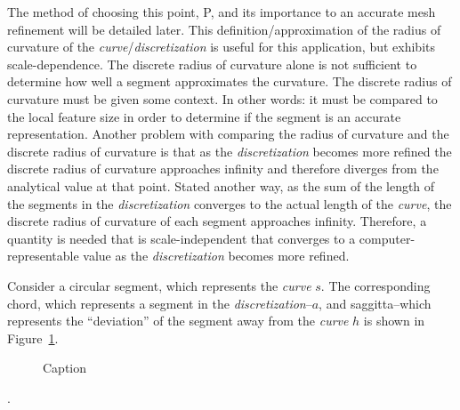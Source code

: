 The method of choosing this point, P, and its importance to an accurate mesh refinement will be detailed later. This definition/approximation of the radius of curvature of the \textit{curve}/\textit{discretization} is useful for this application, but exhibits scale-dependence. The discrete radius of curvature alone is not sufficient to determine how well a segment approximates the curvature. The discrete radius of curvature must be given some context. In other words: it must be compared to the local feature size in order to determine if the segment is an accurate representation. Another problem with comparing the radius of curvature and the discrete radius of curvature is that as the \textit{discretization} becomes more refined the discrete radius of curvature approaches infinity and therefore diverges from the analytical value at that point. Stated another way, as the sum of the length of the segments in the \textit{discretization} converges to the actual length of the \textit{curve}, the discrete radius of curvature of each segment approaches infinity. Therefore, a quantity is needed that is scale-independent that converges to a computer-representable value as the \textit{discretization} becomes more refined.

Consider a circular segment, which represents the \textit{curve} $s$.  The corresponding chord, which represents a segment in the \textit{discretization}--$a$, and saggitta--which represents the ``deviation'' of the segment away from the \textit{curve} $h$ is shown in Figure~\ref{CircleGeometry}.

\begin{figure}
  \caption{\label{CircleGeometry} Caption}
\end{figure}.

